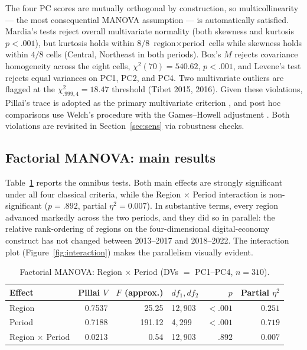 \documentclass[12pt,letterpaper]{article}
\begin{document}
The four PC scores are mutually orthogonal by construction, so
multicollinearity --- the most consequential MANOVA assumption --- is
automatically satisfied.  Mardia's tests reject overall multivariate normality
(both skewness and kurtosis $p<.001$), but kurtosis holds within $8/8$
$\text{region}\times\text{period}$ cells while skewness holds within $4/8$
cells (Central, Northeast in both periods).  Box's $M$ rejects covariance
homogeneity across the eight cells, $\chi^{2}(70)=540.62$, $p<.001$, and
Levene's test rejects equal variances on PC1, PC2, and PC4.  Two multivariate
outliers are flagged at the $\chi^{2}_{.999,4}=18.47$ threshold (Tibet 2015,
2016).  Given these violations, Pillai's trace is adopted as the primary
multivariate criterion \citep{tabachnick2019}, and post hoc comparisons use
Welch's procedure with the Games--Howell adjustment \citep{games1976}.  Both
violations are revisited in Section~\ref{sec:sens} via robustness checks.

\subsection{Factorial MANOVA: main results}

Table~\ref{tab:manova} reports the omnibus tests.  Both main effects are
strongly significant under all four classical criteria, while the Region
$\times$ Period interaction is non-significant ($p=.892$, partial
$\eta^{2}=0.007$).  In substantive terms, every region advanced markedly
across the two periods, and they did so {in parallel}: the relative
rank-ordering of regions on the four-dimensional digital-economy construct
has not changed between 2013--2017 and 2018--2022.  The interaction plot
(Figure~\ref{fig:interaction}) makes the parallelism visually evident.



\begin{table}[H]
\centering
\caption{Factorial MANOVA: Region $\times$ Period (DVs $=$ PC1--PC4, $n=310$).}
\label{tab:manova}
\begin{tabular}{l r r l r r}
\toprule
\textbf{Effect} & \textbf{Pillai} $V$ & \textbf{$F$ (approx.)} & \textbf{$df_1, df_2$}
                & \textbf{$p$} & \textbf{Partial $\eta^{2}$}\\
\midrule
Region                  & 0.7537 &  25.25 & 12,\,903 & $<.001$ & $0.251$ \\
Period                  & 0.7188 & 191.12 &  4,\,299 & $<.001$ & $0.719$ \\
Region $\times$ Period  & 0.0213 &   0.54 & 12,\,903 & $.892$  & $0.007$ \\
\bottomrule
\end{tabular}
\end{table}
\end{document}
